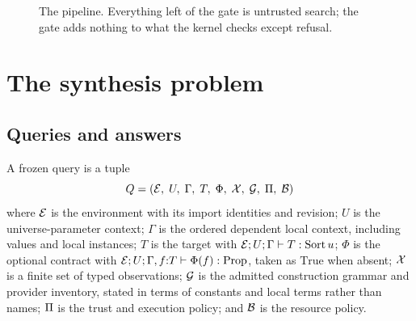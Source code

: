 \begin{figure}[htbp]
\centering
{}
\caption{The pipeline. Everything left of the gate is untrusted search; the gate adds nothing to what the kernel checks except refusal.}
\label{fig:pipeline}
\end{figure}

\section{The synthesis problem}\label{sec:problem}

\subsection{Queries and answers}

\begin{definition}\label{def:query}
A frozen query is a tuple
\[
Q = (\mathcal{E},\; U,\; \Gamma,\; T,\; \Phi,\; \mathcal{X},\; \mathcal{G},\; \Pi,\; \mathcal{B})
\]
where $\mathcal{E}$ is the environment with its import identities and revision; $U$ is the universe-parameter context; $\Gamma$ is the ordered dependent local context, including  values and local instances; $T$ is the target with $\mathcal{E};U;\Gamma \vdash T : \mathrm{Sort}\,u$; $\Phi$ is the optional contract with $\mathcal{E};U;\Gamma, f{:}T \vdash \Phi(f) : \mathrm{Prop}$, taken as $\mathrm{True}$ when absent; $\mathcal{X}$ is a finite set of typed observations; $\mathcal{G}$ is the admitted construction grammar and provider inventory, stated in terms of constants and local terms rather than names; $\Pi$ is the trust and execution policy; and $\mathcal{B}$ is the resource policy.
\end{definition}

